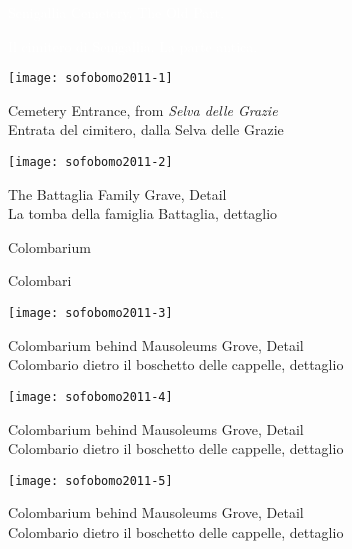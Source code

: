 \begin{center}

\pagecolor{MyGray}
\pagestyle{empty}
\vspace*{2in}

\hfill{\textsf{\textcolor{white}{\Huge Senigallia Cemetery. The Old Part.}}}

\hfill{\textsf{\textcolor{white}{\LARGE Il cimitero di Senigallia. La parte antica.}}}

\clearpage{\pagestyle{empty}\cleardoublepage}

\pagecolor{white}
\pagestyle{plain}

\texttt{[image: sofobomo2011-1]}

{Cemetery Entrance, from \emph{Selva delle Grazie}}\\
{\footnotesize Entrata del cimitero, dalla Selva delle Grazie}
\vspace*{\fill}
\newpage

\texttt{[image: sofobomo2011-2]}

{The Battaglia Family Grave, Detail}\\
{\footnotesize La tomba della famiglia Battaglia, dettaglio}
\vspace*{\fill}
\newpage

\pagestyle{empty}
\vspace*{2in}

\hfill{\textsf{\Huge Colombarium}}

\hfill{\textsf{\LARGE Colombari}}

\clearpage{\pagestyle{empty}\cleardoublepage}

\pagestyle{plain}

\texttt{[image: sofobomo2011-3]}

{Colombarium behind Mausoleums Grove, Detail}\\
{\footnotesize Colombario dietro il boschetto delle cappelle, dettaglio}
\vspace*{\fill}
\newpage

\texttt{[image: sofobomo2011-4]}

{Colombarium behind Mausoleums Grove, Detail}\\
{\footnotesize Colombario dietro il boschetto delle cappelle, dettaglio}
\vspace*{\fill}
\newpage

\texttt{[image: sofobomo2011-5]}

{Colombarium behind Mausoleums Grove, Detail}\\
{\footnotesize Colombario dietro il boschetto delle cappelle, dettaglio}
\vspace*{\fill}
\newpage


\end{center}
